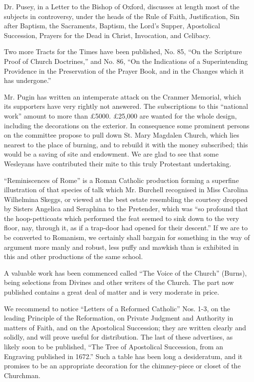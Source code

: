 Dr. Pusey, in a Letter to the Bishop of Oxford,
discusses at length most of the subjects in controversy, under the heads
of the Rule of Faith, Justification, Sin after Baptism, the Sacraments,
Baptism, the Lord's Supper, Apostolical Succession, Prayers for the Dead
in Christ, Invocation, and Celibacy.

Two more Tracts for the Times have been published,
No. 85, ``On the Scripture Proof of Church Doctrines,'' and No. 86, ``On
the Indications of a Superintending Providence in the Preservation of
the Prayer Book, and in the Changes which it has undergone.''

Mr. Pugin has written an intemperate attack on the
Cranmer Memorial, which its supporters have very rightly not answered.
The subscriptions to this ``national work'' amount to more than £5000. £25,000
are wanted for the whole design, including the decorations on the
exterior. In consequence some prominent persons on the committee propose
to pull down St. Mary Magdalen Church, which lies nearest to the place
of burning, and to rebuild it with the money subscribed; this would be a
saving of site and endowment. We are glad to see that some Wesleyans
have contributed their mite to this truly Protestant undertaking.

``Reminiscences of Rome'' is a Roman Catholic
production forming a superfine illustration of that species of talk
which Mr. Burchell recognised in Miss Carolina Wilhelmina Skeggs, or
viewed at the best estate resembling the courtesy dropped by Sisters
Angelica and Seraphina to the Pretender, which was ``so profound that the
hoop-petticoats which performed the feat seemed to sink down to the very
floor, nay, through it, as if a trap-door had opened for their descent.''
If we are to be converted to Romanism, we certainly shall bargain for
something in the way of argument more manly and robust, less puffy and
mawkish than is exhibited in this and other productions of the same
school.

A valuable work has been commenced called ``The
Voice of the Church'' (Burns), being selections from Divines and other
writers of the Church. The part now published contains a great
deal of matter and is very moderate in price.

We recommend to notice ``Letters of a Reformed
Catholic'' Nos. 1-3, on the leading Principle of the Reformation, on
Private Judgment and Authority in matters of Faith, and on the
Apostolical Succession; they are written clearly and solidly, and will
prove useful for distribution. The last of these advertises, as likely
soon to be published, ``The Tree of Apostolical Succession, from an
Engraving published in 1672.'' Such a table has been long a desideratum,
and it promises to be an appropriate decoration for the chimney-piece or
closet of the Churchman.

